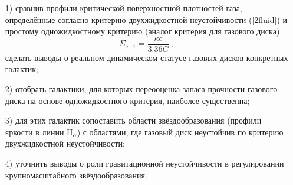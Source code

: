 \documentclass[russian,12pt]{article}
\begin{document}
\begin{enumerate}

\item[1)]
сравнив профили критической поверхностной плотностей газа, 
определённые согласно критерию двухжидкостной неустойчивости 
(\ref{2fluid}) и простому одножидкостному критерию \cite{GL_B65} 
(аналог критерия \citep{Toomre64} для газового диска)
\begin{equation}
\Sigma_\mathrm{cr,1} = \frac{\kappa c}{3.36 G} \, ,
\label{1fluid}
\end{equation}
сделать выводы о реальном динамическом статусе газовых дисков 
конкретных галактик;

\item[2)]
отобрать галактики, для которых переооценка запаса прочности газового 
диска на основе одножидкостного критерия, наиболее существенна;

\item[3)]
для этих галактик сопоставить области звёздообразования (профили яркости в 
линии H$_\alpha$) с областями, где газовый диск неустойчив по критерию 
двухжидкостной неустойчивости;

\item[4)]
уточнить выводы о роли гравитационной неустойчивости в регулировании 
крупномасштабного звёздообразования.

\end{enumerate}
\end{document}
